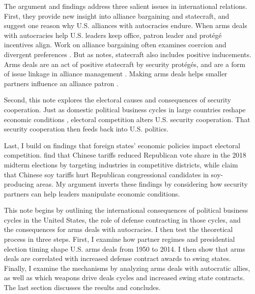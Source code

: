 \documentclass[12pt]{article}
\begin{document}


The argument and findings address three salient issues in international relations. 
First, they provide new insight into alliance bargaining and statecraft, and suggest one reason why U.S. alliances with autocracies endure. 
When arms deals with autocracies help U.S. leaders keep office, patron leader and prot{\'e}g{\'e} incentives align.
Work on alliance bargaining often examines coercion and divergent preferences \citep{WolfordKim2017, Resnick2019, Blankenship2020, Beckeretal2023}. %
But as \citet{Baldwin2020} notes, statecraft also includes positive inducements. 
Arms deals are an act of positive statecraft by security prot{\'e}g{\'e}s, and are a form of issue linkage in alliance management \citep{Davis2008, Poast2013}.
Making arms deals helps smaller partners influence an alliance patron \citep{Keohane1971}.


Second, this note explores the electoral causes and consequences of security cooperation. 
Just as domestic political business cycles in large countries reshape economic conditions \citep{Kayser2006}, electoral competition alters U.S. security cooperation. 
That security cooperation then feeds back into U.S. politics. 


Last, I build on findings that foreign states' economic policies impact electoral competition. 
\citet{KimMargalit2021} find that Chinese tariffs reduced Republican vote share in the 2018 midterm elections by targeting industries in competitive districts, while \citet{ChyzhUrbatsch2021} claim that Chinese soy tariffs hurt Republican congressional candidates in soy-producing areas. 
My argument inverts these findings by considering how security partners can help leaders manipulate economic conditions. 


This note begins by outlining the international consequences of political business cycles in the United States, the role of defense contracting in those cycles, and the consequences for arms deals with autocracies. 
I then test the theoretical process in three steps. 
First, I examine how partner regimes and presidential election timing shape U.S. arms deals from 1950 to 2014.
I then show that arms deals are correlated with increased defense contract awards to swing states.
Finally, I examine the mechanisms by analyzing arms deals with autocratic allies, as well as which weapons drive deals cycles and increased swing state contracts.
The last section discusses the results and concludes.
\end{document}
